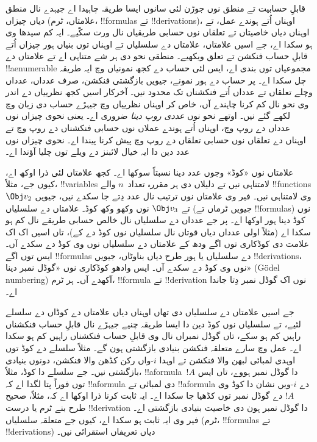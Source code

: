 \documentclass[../../../include/open-logic-section]{subfiles}
\begin{document}

قابلِ حسابیت تے منطق نوں جوڑن لئی سانوں ایسا طریقہ چاہیدا اے
جیہدے نال منطق دیاں چیزاں (علامتاں، ٹرم، !!{formula}s تے
!!{derivation}s)، اوہناں اُتے ہوندے عمل، تے اوہناں دیاں خاصیتاں
تے تعلقاں نوں حسابی طریقیاں نال ورت سکّیے۔ ایہ کم سیدھا وی ہو سکدا
اے، جے اسیں علامتاں، علامتاں دے سلسلیاں تے اوہناں توں بنیاں ہور
چیزاں اُتے قابلِ حساب فنکشن تے تعلق ویکھیے۔ منطقی نحو دی ہر شے
متناہی اے تے علامتاں دے !!a{enumerable} مجموعیاں توں بندی اے،
ایس لئی حساب دے کجھ نمونیاں وچ ایہ طریقہ چل سکدا اے۔ پر حساب دے
ہور نمونے، جیویں بازگشتی فنکشن، صرف عدداں، عدداں وچلے تعلقاں
تے عدداں اُتے فنکشناں تک محدود نیں۔ آخرکار اسیں کجھ نظرییاں دے
اندر وی نحو نال کم کرنا چاہندے آں، خاص کر اوہناں نظرییاں وچ
جیہڑے حساب دی زبان وچ لکھے گئے نیں۔ اوتھے نحو نوں \emph{عددی
روپ دینا} ضروری اے۔ یعنی نحوی چیزاں نوں عدداں دے روپ وچ، اوہناں
اُتے ہوندے عملاں نوں حسابی فنکشناں دے روپ وچ تے اوہناں دے تعلقاں
نوں حسابی تعلقاں دے روپ وچ پیش کرنا پیندا اے۔ نحوی چیزاں نوں
عدد دین دا ایہ خیال لائبنز دے ویلے توں چلیا آؤندا اے۔

علامتاں نوں «کوڈ» وجوں عدد دینا نسبتاً سوکھا اے۔ کجھ علامتاں
لئی ذرا اوکھ اے، کیوں جے، مثلاً، !!{variable}s لامتناہی نیں تے
دلیلاں دی ہر مقررہ تعداد~$n$ والے !!{function}s وی لامتناہی نیں۔
فیر وی علامتاں نوں ترتیب نال عدد دِتے جا سکدے نیں، جیویں
$\Obj v_2$ تے $\Obj v_3$ نوں وکھو وکھ کوڈ۔ علامتاں دے سلسلیاں
(جیویں ٹرماں تے !!{formula}s) نوں کوڈ دینا ہور اوکھا اے۔ پر جے
عدداں دے سلسلیاں نال خالص حسابی طریقے نال کم ہو سکدا اے
(مثلاً اولی عدداں دیاں قوتاں نال سلسلیاں نوں کوڈ دے کے)، تاں
اسیں اک اک علامت دی کوڈکاری توں اگے ودھ کے علامتاں دے سلسلیاں
نوں وی کوڈ دے سکدے آں۔ ایس توں اگے !!{formula}s دے سلسلیاں یا
ہور طرح دیاں بناوٹاں، جیویں !!{derivation}s، نوں وی کوڈ دے سکدے
آں۔ ایس وادھو کوڈکاری نوں «گوڈل نمبر دینا» (Gödel numbering)
آکھدے آں۔ ہر ٹرم، !!{formula} تے !!{derivation} نوں اک گوڈل
نمبر دِتا جاندا اے۔

جے اسیں علامتاں دے سلسلیاں دی تھاں اوہناں دیاں علامتاں دے
کوڈاں دے سلسلے لئیے، تے سلسلیاں نوں کوڈ دین دا ایسا طریقہ چنیے
جیہڑے نال قابلِ حساب فنکشناں راہیں کم ہو سکے، تاں گوڈل نمبراں
نال وی قابلِ حساب فنکشناں راہیں کم ہو سکدا اے۔ عمل وچ سارے
متعلقہ فنکشن بنیادی بازگشتی ہون گے۔ مثلاً سلسلے دے کوڈ توں
اوہدی لمبائی لبھن والا فنکشن تے اوہدا $i$-واں رکن کڈھن والا
فنکشن، دونوں بنیادی بازگشتی نیں۔ جے سلسلے دا کوڈ، مثلاً،
!!a{formula}~$!A$ دا گوڈل نمبر ہووے، تاں ایس توں فوراً پتا لگدا
اے کہ !!a{formula} دی لمبائی تے !!a{formula} دے $i$-ویں نشان
دا کوڈ وی $!A$ دے گوڈل نمبر توں کڈھیا جا سکدا اے۔ ایہ ثابت
کرنا ذرا اوکھا اے کہ، مثلاً، صحیح طرح بنے ٹرم یا درست
!!{derivation} دا گوڈل نمبر ہون دی خاصیت بنیادی بازگشتی اے۔
فیر وی ایہ ثابت ہو سکدا اے، کیوں جے متعلقہ سلسلیاں (ٹرم،
!!{formula}s تے !!{derivation}s) دیاں تعریفاں استقرائی نیں۔
\end{document}
